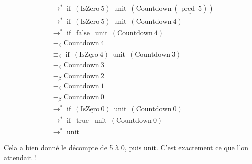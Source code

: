 \documentclass[11pt]{article}
\begin{document}
\begin{enumerate}
\begin{equation*}
\begin{aligned}
        &\longrightarrow^* \operatorname{if}~(\text{IsZero}~5)~\operatorname{unit}~(\text{Countdown}~(\underline{\operatorname{pred}~5}))\\
        &\longrightarrow^* \operatorname{if}~(\underline{\text{IsZero}~5})~\operatorname{unit}~(\text{Countdown}~4)\\
        &\longrightarrow^* \operatorname{if}~\operatorname{false}~\operatorname{unit}~(\text{Countdown}~4)\\
        &\equiv_\beta \text{Countdown}~4\\
        &\equiv_\beta \operatorname{if}~(\underline{\text{IsZero}~4})~\operatorname{unit}~(\text{Countdown}~3)\\
        &\equiv_\beta \text{Countdown}~3\\
        &\equiv_\beta \text{Countdown}~2\\
        &\equiv_\beta \text{Countdown}~1\\
        &\equiv_\beta \text{Countdown}~0\\
        &\longrightarrow^* \operatorname{if}~(\underline{\text{IsZero}~0})~\operatorname{unit}~(\text{Countdown}~0)\\
        &\longrightarrow^* \operatorname{if}~\operatorname{true}~\operatorname{unit}~(\text{Countdown}~0)\\
        &\longrightarrow^*\operatorname{unit}
    \end{aligned}
    \end{equation*}

    Cela a bien donné le décompte de 5 à 0, puis unit. C'est exactement ce que l'on attendait !
\end{enumerate}
\end{document}
